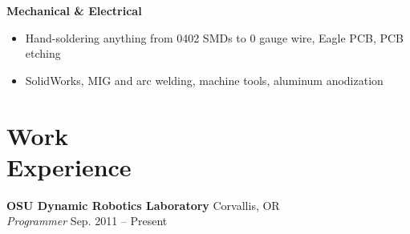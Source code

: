 \documentclass[10pt,letterpaper,margin]{res}
\begin{document}
\begin{resume}
{\bf Mechanical \& Electrical}\vspace{0.2em}

\begin{itemize}
	\item Hand-soldering anything from 0402 SMDs to 0 gauge wire, Eagle PCB, PCB etching
	\item SolidWorks, MIG and arc welding, machine tools, aluminum anodization
\end{itemize}



\section{Work \\ Experience}

% 


{\bf OSU Dynamic Robotics Laboratory} \hfill {\color{lightgray} Corvallis, OR} \\
{\it Programmer} \hfill {\color{lightgray} Sep. 2011 -- Present}\vspace{0.2em}


\end{resume}
\end{document}

